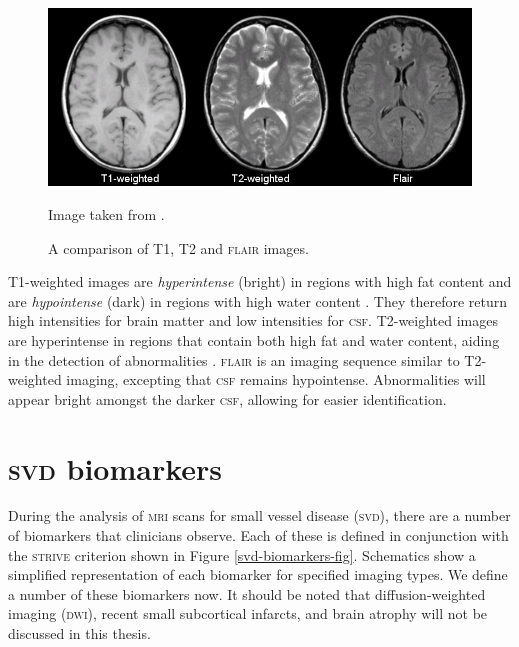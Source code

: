 \begin{figure}[ht]
	\centering
	\includegraphics[width=\textwidth]{Images/2_t1_t2_flair.jpg}
	\caption{\small{A comparison of T1, T2 and \textsc{flair} images.}}
	\small Image taken from \cite{Preston2006}.
	\label{svd-t1-vs-t2}
\end{figure}

T1-weighted images are \textit{hyperintense} (bright) in regions with high fat content and are \textit{hypointense} (dark) in regions with high water content \citep{Bitar2006}. They therefore return high intensities for brain matter and low intensities for \textsc{csf}. T2-weighted images are hyperintense in regions that contain both high fat and water content, aiding in the detection of abnormalities \citep{Bitar2006}. \textsc{flair} is an imaging sequence similar to T2-weighted imaging, excepting that \textsc{csf} remains hypointense. Abnormalities will appear bright amongst the darker \textsc{csf}, allowing for easier identification.

\section{\textsc{svd} biomarkers}\label{svd-markers}

During the analysis of \textsc{mri} scans for small vessel disease (\textsc{svd}), there are a number of biomarkers that clinicians observe. Each of these is defined in conjunction with the \textsc{strive} criterion \citep{WardlawJ.M.2013Nsfr} shown in Figure \ref{svd-biomarkers-fig}. Schematics show a simplified representation of each biomarker for specified imaging types. We define a number of these biomarkers now. It should be noted that diffusion-weighted imaging (\textsc{dwi}), recent small subcortical infarcts, and brain atrophy will not be discussed in this thesis. 

